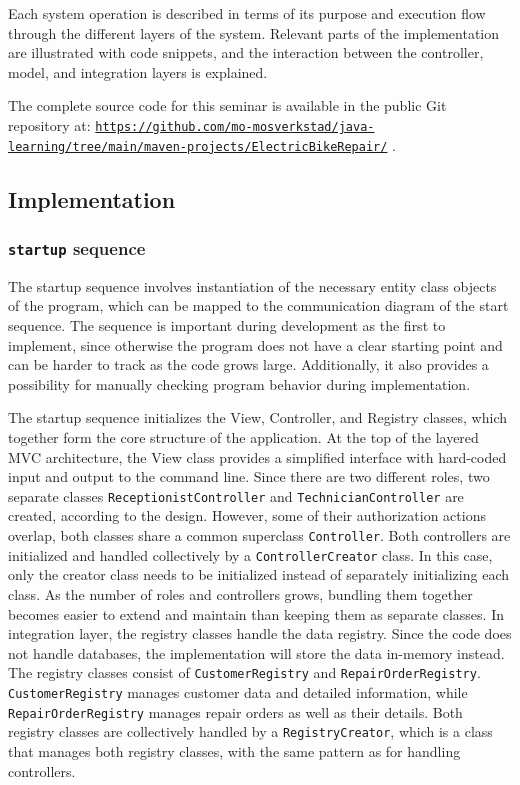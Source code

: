 \documentclass[a4paper]{scrartcl}
\begin{document}
Each system operation is described in terms of its purpose and execution flow through the different layers of the system. Relevant parts of the implementation are illustrated with code snippets, and the interaction between the controller, model, and integration layers is explained.

The complete source code for this seminar is available in the public Git repository at: \href{https://github.com/mo-mosverkstad/java-learning/tree/main/maven-projects/ElectricBikeRepair/}{\nolinkurl{https://github.com/mo-mosverkstad/java-learning/tree/main/maven-projects/ElectricBikeRepair/}} \cite{sourcecode}.

\subsection{Implementation}

\subsubsection{\texttt{startup} sequence}

The startup sequence involves instantiation of the necessary entity class objects of the program, which can be mapped to the communication diagram of the start sequence. The sequence is important during development as the first to implement, since otherwise the program does not have a clear starting point and can be harder to track as the code grows large. Additionally, it also provides a possibility for manually checking program behavior during implementation. 

The startup sequence initializes the View, Controller, and Registry classes, which together form the core structure of the application. At the top of the layered MVC architecture, the View class provides a simplified interface with hard-coded input and output to the command line. Since there are two different roles, two separate classes \texttt{ReceptionistController} and \texttt{TechnicianController} are created, according to the design. However, some of their authorization actions overlap, both classes share a common superclass \texttt{Controller}.
Both controllers are initialized and handled collectively by a \texttt{ControllerCreator} class. In this case, only the creator class needs to be initialized instead of separately initializing each class. As the number of roles and controllers grows, bundling them together becomes easier to extend and maintain than keeping them as separate classes.
In integration layer, the registry classes handle the data registry. Since the code does not handle databases, the implementation will store the data in-memory instead.
The registry classes consist of \texttt{CustomerRegistry} and \texttt{RepairOrderRegistry}. \texttt{CustomerRegistry} manages customer data and detailed information, while \texttt{RepairOrderRegistry} manages repair orders as well as their details. Both registry classes are collectively handled by a \texttt{RegistryCreator}, which is a class that manages both registry classes, with the same pattern as for handling controllers.
\end{document}
